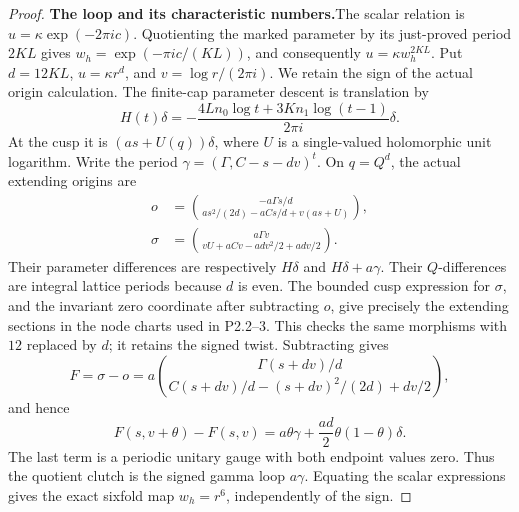 \begin{proof}
\par\medskip\noindent\textbf{The loop and its characteristic numbers.}\enspace The scalar
relation is \(u=\kappa\exp(-2\pi i c)\).  Quotienting the
marked parameter by its just-proved period \(2KL\) gives
\(w_h=\exp(-\pi i c/(KL))\), and consequently
\(u=\kappa w_h^{2KL}\).  Put \(d=12KL\),
\(u=\kappa r^d\), and \(v=\log r/(2\pi i)\).
We retain the sign of the actual origin calculation.  The
finite-cap parameter descent is translation by
\[
 H(t)\delta=-\frac{4L n_0\log t+3K n_1\log(t-1)}{2\pi i}\delta.
\]
At the cusp it is \((as+U(q))\delta\), where \(U\) is a
single-valued holomorphic unit logarithm.  Write the period
\(\gamma=(\Gamma,C-s-dv)^t\).  On \(q=Q^d\), the
actual extending origins are
\[
\begin{split}
 o&=\binom{-a\Gamma s/d}{a s^2/(2d)-aCs/d+v(as+U)},\\
 \sigma&=\binom{a\Gamma v}{vU+aCv-ad v^2/2+ad v/2}.
\end{split}
\]
Their parameter differences are respectively \(H\delta\)
and \(H\delta+a\gamma\).  Their \(Q\)-differences are
integral lattice periods because \(d\) is even.  The
bounded cusp expression for \(\sigma\), and the invariant
zero coordinate after subtracting \(o\), give precisely the
extending sections in the node charts used in P2.2--3.
This checks the same morphisms with \(12\) replaced by
\(d\); it retains the signed twist.  Subtracting gives
\[
 F=\sigma-o
 =a\binom{\Gamma(s+dv)/d}{C(s+dv)/d-(s+dv)^2/(2d)+dv/2},
\]
and hence
\[
 F(s,v+\theta)-F(s,v)
 =a\theta\gamma+\frac{ad}{2}\theta(1-\theta)\delta.
\]
The last term is a periodic unitary gauge with both endpoint
values zero.  Thus the quotient clutch is the signed gamma
loop \(a\gamma\).  Equating the scalar expressions gives
the exact sixfold map \(w_h=r^6\), independently of the sign.


\end{proof}
